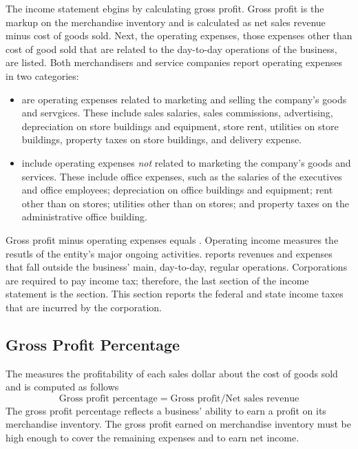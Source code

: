 \documentclass{article}
\begin{document}
The income statement ebgins by calculating gross profit. Gross profit is the markup on the merchandise inventory and is calculated as net sales revenue minus cost of goods sold. Next, the operating expenses, those expenses other than cost of good sold that are related to the day-to-day operations of the business, are listed. Both merchandisers and service companies report operating expenses in two categories: 
\begin{itemize}
  \item {} are operating expenses related to marketing and selling the company's goods and servgices. These include sales salaries, sales commissions, advertising, depreciation on store buildings and equipment, store rent, utilities on store buildings, property taxes on store buildings, and delivery expense. 
  \item {} include operating expenses \emph{not} related to marketing the company's goods and services. These include office expenses, such as the salaries of the executives and office employees; depreciation on office buildings and equipment; rent other than on stores; utilities other than on stores; and property taxes on the administrative office building. 
\end{itemize}

Gross profit minus operating expenses equals . Operating income measures the resutls of the entity's major ongoing activities.  reports revenues and expenses that fall outside the business' main, day-to-day, regular operations. Corporations are required to pay income tax; therefore, the last section of the income statement is the  section. This section reports the federal and state income taxes that are incurred by the corporation. 

\subsection{Gross Profit Percentage}

The  measures the profitability of each sales dollar about the cost of goods sold and is computed as follows $$\textrm{Gross profit percentage} = \textrm{Gross profit} / \textrm{Net sales revenue}$$ The gross profit percentage reflects a business' ability to earn a profit on its merchandise inventory. The gross profit earned on merchandise inventory must be high enough to cover the remaining expenses and to earn net income. 
\end{document}

